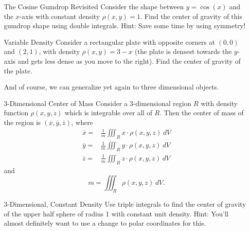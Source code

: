 \begin{exercise}{The Cosine Gumdrop Revisited}
Consider the shape between $y=\cos(x)$ and the $x$-axis with constant density $\rho(x,y)=1$. Find the center of gravity of this gumdrop shape using double integrals. Hint: Save some time by using symmetry!
\end{exercise}

\begin{exercise}{Variable Density}
Consider a rectangular plate with opposite corners at $(0,0)$ and $(2,1)$, with density $\rho(x,y)=3-x$ (the plate is densest towards the $y$-axis and gets less dense as you move to the right). Find the center of gravity of the plate.
\end{exercise}

And of course, we can generalize yet again to three dimensional objects.

\begin{definition}{3-Dimensional Center of Mass}
Consider a 3-dimensional region $R$ with density function $\rho(x,y,z)$ which is integrable over all of $R$. Then the center of mass of the region is $(\overline{x},\overline{y},\overline{z})$, where
 \begin{align*}
 \overline{x}=&\frac{1}{m}\iiint_R x\cdot\rho(x,y,z) \ dV \\
 \overline{y}=&\frac{1}{m}\iiint_R y\cdot\rho(x,y,z)\ dV \\
 \overline{z}=&\frac{1}{m}\iiint_R z\cdot\rho(x,y,z)\ dV
 \end{align*}
 and $$m=\iiint_R \rho(x,y,z)\ dV. $$
\end{definition}

\begin{exercise}{3-Dimensional, Constant Density}
Use triple integrals to find the center of gravity of the upper half sphere of radius 1 with constant unit density. Hint: You'll almost definitely want to use a change to polar coordinates for this. 
\end{exercise}
